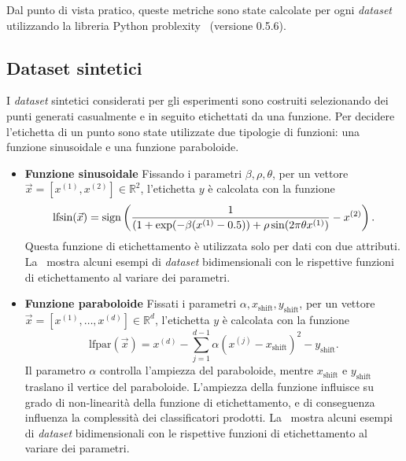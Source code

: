 Dal punto di vista pratico, queste metriche sono state calcolate per ogni \emph{dataset} utilizzando la libreria Python problexity~\cite{problexity} (versione 0.5.6).

\subsection{Dataset sintetici}
I \emph{dataset} sintetici considerati per gli esperimenti sono costruiti selezionando dei punti generati casualmente e in seguito etichettati da una funzione.
Per decidere l'etichetta di un punto sono state utilizzate due tipologie di funzioni: una funzione sinusoidale e una funzione paraboloide.
\begin{itemize}
    \item \textbf{Funzione sinusoidale} Fissando i parametri $\beta,\rho,\theta$, per un vettore $\Vec{x}=[x^{(1)},x^{(2)}] \in \mathbb{R}^2$, l'etichetta $y$ è calcolata con la funzione
    \begin{equation}\label{eq:sinusoid_dataset_lf}
    \textrm{lfsin}(\Vec{x}) = \mathrm{sign}\left(\frac{1}{(1 + \exp(-\beta(x^{(1)} - 0.5)) + \rho \sin(2\pi\theta x^{(1)})} - x^{(2)}\right).
    \end{equation}
    Questa funzione di etichettamento è utilizzata solo per dati con due attributi. La~ mostra alcuni esempi di \emph{dataset} bidimensionali con le rispettive funzioni di etichettamento al variare dei parametri.

    \item \textbf{Funzione paraboloide} Fissati i parametri $\alpha, x_\text{shift}, y_\text{shift}$, per un vettore $\Vec{x}=[x^{(1)},\dots, x^{(d)}] \in \mathbb{R}^d$, l'etichetta $y$ è calcolata con la funzione
    \begin{equation}\label{eq:pacman_dataset_lf}
    \textrm{lfpar}(\Vec{x})= x^{(d)} - \sum_{j=1}^{d-1}\alpha(x^{(j)} - x_\text{shift})^2 - y_\text{shift}.
    \end{equation}
    Il parametro $\alpha$ controlla l'ampiezza del paraboloide, mentre $x_\text{shift}$ e $y_\text{shift}$ traslano il vertice del paraboloide.
    L'ampiezza della funzione influisce su grado di non-linearità della funzione di etichettamento, e di conseguenza influenza la complessità dei classificatori prodotti.
    La~ mostra alcuni esempi di \emph{dataset} bidimensionali con le rispettive funzioni di etichettamento al variare dei parametri.
\end{itemize}
